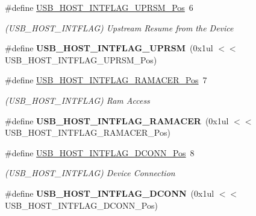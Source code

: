 \begin{DoxyCompactItemize}
\item 
\hypertarget{group___s_a_m_l21___u_s_b_ga03d2c6191e0f7c5c597c619d3162221f}{}\#define \hyperlink{group___s_a_m_l21___u_s_b_ga03d2c6191e0f7c5c597c619d3162221f}{U\+S\+B\+\_\+\+H\+O\+S\+T\+\_\+\+I\+N\+T\+F\+L\+A\+G\+\_\+\+U\+P\+R\+S\+M\+\_\+\+Pos}~6\label{group___s_a_m_l21___u_s_b_ga03d2c6191e0f7c5c597c619d3162221f}

\begin{DoxyCompactList}\small\item\em (U\+S\+B\+\_\+\+H\+O\+S\+T\+\_\+\+I\+N\+T\+F\+L\+A\+G) Upstream Resume from the Device \end{DoxyCompactList}\item 
\hypertarget{group___s_a_m_l21___u_s_b_ga5ac3a6a2768262d13049832801361f7e}{}\#define {\bfseries U\+S\+B\+\_\+\+H\+O\+S\+T\+\_\+\+I\+N\+T\+F\+L\+A\+G\+\_\+\+U\+P\+R\+S\+M}~(0x1ul $<$$<$ U\+S\+B\+\_\+\+H\+O\+S\+T\+\_\+\+I\+N\+T\+F\+L\+A\+G\+\_\+\+U\+P\+R\+S\+M\+\_\+\+Pos)\label{group___s_a_m_l21___u_s_b_ga5ac3a6a2768262d13049832801361f7e}

\item 
\hypertarget{group___s_a_m_l21___u_s_b_gadb7709487d21ffe00abf3343a66e85e8}{}\#define \hyperlink{group___s_a_m_l21___u_s_b_gadb7709487d21ffe00abf3343a66e85e8}{U\+S\+B\+\_\+\+H\+O\+S\+T\+\_\+\+I\+N\+T\+F\+L\+A\+G\+\_\+\+R\+A\+M\+A\+C\+E\+R\+\_\+\+Pos}~7\label{group___s_a_m_l21___u_s_b_gadb7709487d21ffe00abf3343a66e85e8}

\begin{DoxyCompactList}\small\item\em (U\+S\+B\+\_\+\+H\+O\+S\+T\+\_\+\+I\+N\+T\+F\+L\+A\+G) Ram Access \end{DoxyCompactList}\item 
\hypertarget{group___s_a_m_l21___u_s_b_ga8977eb2d4721d768200feb666c043717}{}\#define {\bfseries U\+S\+B\+\_\+\+H\+O\+S\+T\+\_\+\+I\+N\+T\+F\+L\+A\+G\+\_\+\+R\+A\+M\+A\+C\+E\+R}~(0x1ul $<$$<$ U\+S\+B\+\_\+\+H\+O\+S\+T\+\_\+\+I\+N\+T\+F\+L\+A\+G\+\_\+\+R\+A\+M\+A\+C\+E\+R\+\_\+\+Pos)\label{group___s_a_m_l21___u_s_b_ga8977eb2d4721d768200feb666c043717}

\item 
\hypertarget{group___s_a_m_l21___u_s_b_ga2d296525954b29ff886f46496670c925}{}\#define \hyperlink{group___s_a_m_l21___u_s_b_ga2d296525954b29ff886f46496670c925}{U\+S\+B\+\_\+\+H\+O\+S\+T\+\_\+\+I\+N\+T\+F\+L\+A\+G\+\_\+\+D\+C\+O\+N\+N\+\_\+\+Pos}~8\label{group___s_a_m_l21___u_s_b_ga2d296525954b29ff886f46496670c925}

\begin{DoxyCompactList}\small\item\em (U\+S\+B\+\_\+\+H\+O\+S\+T\+\_\+\+I\+N\+T\+F\+L\+A\+G) Device Connection \end{DoxyCompactList}\item 
\hypertarget{group___s_a_m_l21___u_s_b_gaf1f2a2a216b283abf6cb71d4b64cbf76}{}\#define {\bfseries U\+S\+B\+\_\+\+H\+O\+S\+T\+\_\+\+I\+N\+T\+F\+L\+A\+G\+\_\+\+D\+C\+O\+N\+N}~(0x1ul $<$$<$ U\+S\+B\+\_\+\+H\+O\+S\+T\+\_\+\+I\+N\+T\+F\+L\+A\+G\+\_\+\+D\+C\+O\+N\+N\+\_\+\+Pos)\label{group___s_a_m_l21___u_s_b_gaf1f2a2a216b283abf6cb71d4b64cbf76}


\end{DoxyCompactItemize}
